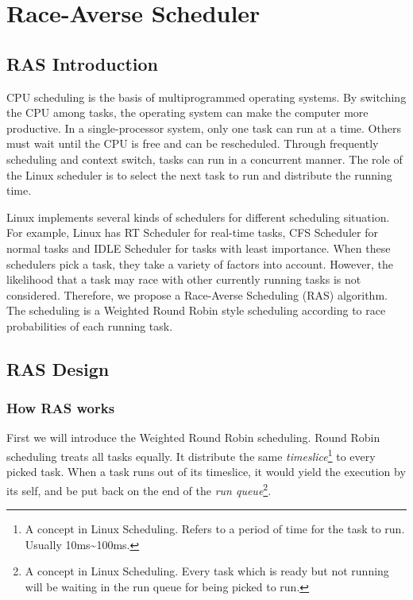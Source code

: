 
\chapter{Race-Averse Scheduler}

\section{RAS Introduction}

CPU scheduling is the basis of multiprogrammed operating systems. By switching the CPU among tasks, the operating system can make the computer more productive. In a single-processor system, only one task can run at a time. Others must wait until the CPU is free and can be rescheduled\cite{schedintro}. Through frequently scheduling and context switch, tasks can run in a concurrent manner. The role of the Linux scheduler is to select the next task to run and distribute the running time.

Linux implements several kinds of schedulers for different scheduling situation. For example, Linux has RT Scheduler for real-time tasks, CFS Scheduler for normal tasks and IDLE Scheduler for tasks with least importance. When these schedulers pick a task, they take a variety of factors into account. However, the likelihood that a task may race with other currently running tasks is not considered. Therefore, we propose a Race-Averse Scheduling (RAS) algorithm. The scheduling is a Weighted Round Robin style scheduling according to race probabilities of each running task.

\section{RAS Design}

\subsection{How RAS works}

First we will introduce the Weighted Round Robin scheduling. Round Robin scheduling treats all tasks equally. It distribute the same \textit{timeslice}\footnote{A concept in Linux Scheduling. Refers to a period of time for the task to run. Usually 10ms\textasciitilde100ms.} to every picked task. When a task runs out of its timeslice, it would yield the execution by its self, and be put back on the end of the \textit{run queue}\footnote{A concept in Linux Scheduling. Every task which is ready but not running will be waiting in the run queue for being picked to run.}. 

